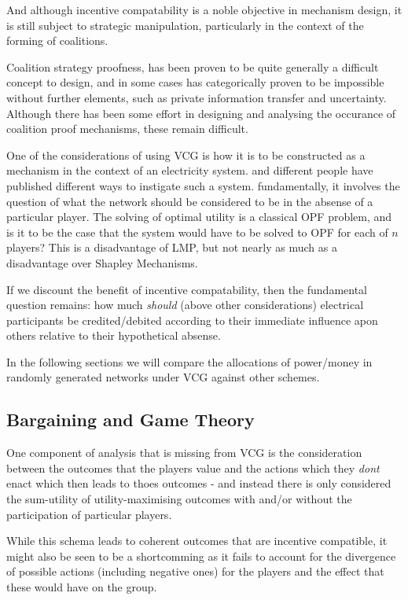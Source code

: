 And although incentive compatability is a noble objective in mechanism design, it is still subject to strategic manipulation, particularly in the context of the forming of coalitions.

Coalition strategy proofness, has been proven to be quite generally a difficult concept to design, and in some cases has categorically proven to be impossible \cite{10.2307/2297048} without further elements, such as private information transfer and uncertainty.
Although there has been some effort in designing and analysing the occurance of coalition proof mechanisms, these remain difficult.

One of the considerations of using VCG is how it is to be constructed as a mechanism in the context of an electricity system.
and different people have published different ways to instigate such a system.
fundamentally, it involves the question of what the network should be considered to be in the absense of a particular player.
The solving of optimal utility is a classical OPF problem, and is it to be the case that the system would have to be solved to OPF for each of $n$ players?
This is a disadvantage of LMP, but not nearly as much as a disadvantage over Shapley Mechanisms.

If we discount the benefit of incentive compatability, then the fundamental question remains: how much \textit{should} (above other considerations) electrical participants be credited/debited according to their immediate influence apon others relative to their hypothetical absense.

In the following sections we will compare the allocations of power/money in randomly generated networks under VCG against other schemes.


\subsection{Bargaining and Game Theory}

One component of analysis that is missing from VCG is the consideration between the outcomes that the players value and the actions which they \textit{dont} enact which then leads to thoes outcomes - and instead there is only considered the sum-utility of utility-maximising outcomes with and/or without the participation of particular players.

While this schema leads to coherent outcomes that are incentive compatible, it might also be seen to be a shortcomming as it fails to account for the divergence of possible actions (including negative ones) for the players and the effect that these would have on the group.

